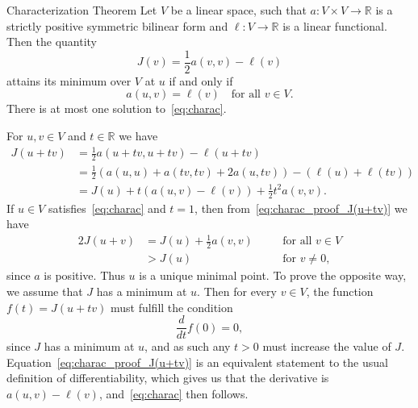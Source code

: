 
\begin{thmx}{Characterization Theorem}
    Let $V$ be a linear space, such that\label{thm:charac_theorem}
        \(
            a: V \times V \rightarrow \mathbb{R}
        \) 
    is a strictly positive symmetric bilinear form
     and
        \(
            \ell: V \rightarrow \mathbb{R}
        \)
    is a linear functional. Then the quantity
        \[
            J(v)=\frac{1}{2} a(v,v) - \ell(v)
        \]
    attains its minimum over $V$ at $u$ if and only if
        \begin{equation}
            a(u,v) = \ell(v) \quad \text{for all } v \in V.
        \label{eq:charac}
        \end{equation}
    There is at most one solution to~\eqref{eq:charac}.
\end{thmx}

\begin{bev}
    For $u,v \in V$ and $t \in \mathbb{R}$ we have
    \begin{align}
        J(u+tv) &= \frac{1}{2} a(u+tv,u+tv) - \ell(u+tv) \nonumber \\
        &= \frac{1}{2} \left( a(u,u) + a(tv,tv) + 2a(u,tv) \right) - \left(  \ell(u) + \ell(tv)\right) \nonumber \\
        &= J(u) + t\left( a(u,v) - \ell(v) \right) + \frac{1}{2}t^2a(v,v). \label{eq:charac_proof_J(u+tv)}
    \end{align}
    If $u \in V$ satisfies~\eqref{eq:charac} and $t=1$, then from~\eqref{eq:charac_proof_J(u+tv)} we have
    \begin{alignat}{2}
        J(u+v) &= J(u) + \frac{1}{2}a(v,v) \quad &&\text{for all } v\in V  \nonumber \\
        &> J(u) \quad &&\text{for } v \neq 0,
    \end{alignat}
    since $a$ is positive.
    Thus $u$ is a unique minimal point. 
    To prove the opposite way, we assume that $J$ has a minimum at $u$.
    Then for every $v\in V$, the function $f(t)= J(u+tv)$ must fulfill the condition
    \begin{equation*}
        \frac{d}{dt}f(0) = 0,
    \end{equation*}
    since $J$ has a minimum at $u$, and as such any $t>0$ must increase the 
    value of $J$.
    Equation~\eqref{eq:charac_proof_J(u+tv)} is an equivalent statement to 
    the usual definition of differentiability, which gives us that 
     the derivative is $a(u,v) - \ell(v)$, and~\eqref{eq:charac} then follows.
\end{bev}